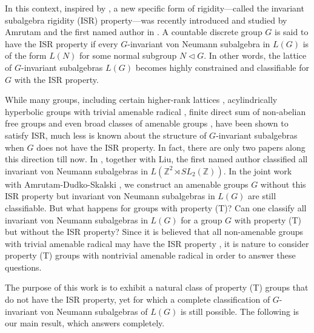 \documentclass[12pt]{amsart}
\theoremstyle{definition}
\theoremstyle{remark}
\begin{document}
In this context, inspired by \cite{kp}, a new specific form of rigidity—called the invariant subalgebra rigidity (ISR) property—was recently introduced and studied by Amrutam and the first named author in \cite{aj}. A countable discrete group $G$
is said to have the ISR property if every $G$-invariant von Neumann subalgebra in $L(G)$ is of the form $L(N)$ for some normal subgroup $N\lhd G$. In other words, the lattice of $G$-invariant subalgebras $L(G)$ becomes highly constrained and classifiable for $G$ with the ISR property.

While many groups, including certain higher-rank lattices \cite{kp}, acylindrically hyperbolic groups with trivial amenable radical \cite{cds}, finite direct sum of non-abelian free groups \cite{aj} and even broad classes of amenable groups \cites{jz, dj, adjs}, have been shown to satisfy ISR, much less is known about the structure of 
$G$-invariant subalgebras when 
$G$ does not have the ISR property. In fact, there are only two papers along this direction till now. In \cite{jiangliu}, together with Liu, the first named author classified all invariant von Neumann subalgebras in $L(\mathbb{Z}^2\rtimes SL_2(\mathbb{Z}))$. In the joint work with Amrutam-Dudko-Skalski \cite{adjs}, we construct an amenable groups $G$ without this ISR property but invariant von Neumann subalgebras in $L(G)$ are still classifiable.
But what happens for groups with property (T)? Can one classify all invariant von Neumann subalgebras in $L(G)$ for a group $G$ with property (T) but without the ISR property? Since it is believed that all non-amenable groups with trivial amenable radical may have the ISR property \cites{cds,dj}, it is nature to consider property (T) groups with nontrivial amenable radical in order to answer these questions. 

The purpose of this work is to  exhibit a natural class of property (T) groups that do not have the ISR property, yet for which a complete classification of 
$G$-invariant von Neumann subalgebras of 
$L(G)$ is still possible. The following is our main result, which answers \cite[Question 4.1]{jiangliu} completely.
\end{document}
